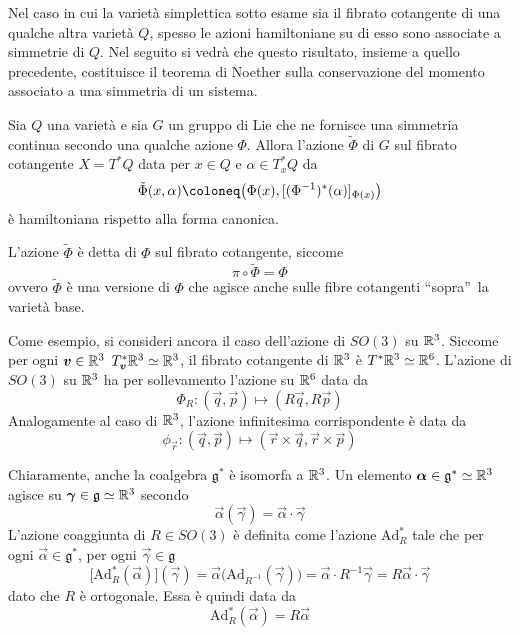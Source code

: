 Nel caso in cui la varietà simplettica sotto esame sia il fibrato cotangente di una qualche altra varietà $Q$, spesso le azioni hamiltoniane su di esso sono associate a simmetrie di $Q$. Nel seguito si vedrà che questo risultato, insieme a quello precedente, costituisce il teorema di Noether sulla conservazione del momento associato a una simmetria di un sistema.
\begin{theorem}
  Sia $Q$ una varietà e sia $G$ un gruppo di Lie che ne fornisce una simmetria continua secondo una qualche azione $\Phi$. Allora l'azione $\tilde{\Phi}$ di $G$ sul fibrato cotangente $X=T^*Q$ data per $x \in Q$ e $\alpha \in T^*_x Q$ da
  \begin{equation}
  \tilde{\Phi}(x,\alpha) \defeq \big(\Phi(x), [(\Phi^{-1})^*(\alpha)]_{\Phi(x)}\big)
  \end{equation} 
  è hamiltoniana rispetto alla forma canonica.
\end{theorem}
\begin{remark}
  L'azione $\tilde{\Phi}$ è detta  di $\Phi$ sul fibrato cotangente, siccome \begin{equation}
  \pi \circ \tilde{\Phi} = \Phi
  \end{equation}
  ovvero $\tilde{\Phi}$ è una versione di $\Phi$ che agisce anche sulle fibre cotangenti \textquotedblleft sopra\textquotedblright\ la varietà base.
\end{remark}

Come esempio, si consideri ancora il caso dell'azione di $SO(3)$ su $\mathbb{R}^3$. Siccome per ogni $\boldsymbol{v} \in  \mathbb{R}^3$ $T^*_{\boldsymbol{v}}\mathbb{R}^3 \simeq \mathbb{R}^3$, il fibrato cotangente di $\mathbb{R}^3$ è $T^*\mathbb{R}^3 \simeq \mathbb{R}^6$. L'azione di $SO(3)$ su $\mathbb{R}^3$ ha per sollevamento l'azione su $\mathbb{R}^6$ data da 
\begin{equation}
\Phi_R: (\vec{q},\vec{p}) \mapsto (R\vec{q},R\vec{p})
\end{equation}  
Analogamente al caso di $\mathbb{R}^3$, l'azione infinitesima corrispondente è data da
\begin{equation}
\phi_{\vec{r}}: (\vec{q},\vec{p}) \mapsto (\vec{r}\times \vec{q},\vec{r}\times \vec{p})
\end{equation}

Chiaramente, anche la coalgebra $\mathfrak{g}^*$ è isomorfa a $\mathbb{R}^3$. Un elemento $\boldsymbol{\alpha} \in \mathfrak{g}^* \simeq \mathbb{R}^3$ agisce su $\boldsymbol{\gamma} \in \mathfrak{g} \simeq \mathbb{R}^3$ secondo
\begin{equation}
\vec{\alpha}(\vec{\gamma}) = \vec{\alpha} \cdot \vec{\gamma}
\end{equation} 
L'azione coaggiunta di $R \in SO(3)$ è definita come l'azione $\mathrm{Ad}^*_R$ tale che per ogni $\vec{\alpha} \in \mathfrak{g}^*$, per ogni $\vec{\gamma} \in \mathfrak{g}$
\begin{equation}
  \big[\mathrm{Ad}^*_R(\vec{\alpha})\big](\vec{\gamma}) = \vec{\alpha}\big(\mathrm{Ad}_{R^{-1}}(\vec{\gamma})\big) = \vec{\alpha} \cdot R^{-1}\vec{\gamma} = R \vec{\alpha} \cdot \vec{\gamma}
\end{equation} 
dato che $R$ è ortogonale. Essa è quindi data da
\begin{equation}
\mathrm{Ad}^*_R(\vec{\alpha}) = R\vec{\alpha}
\end{equation} 

